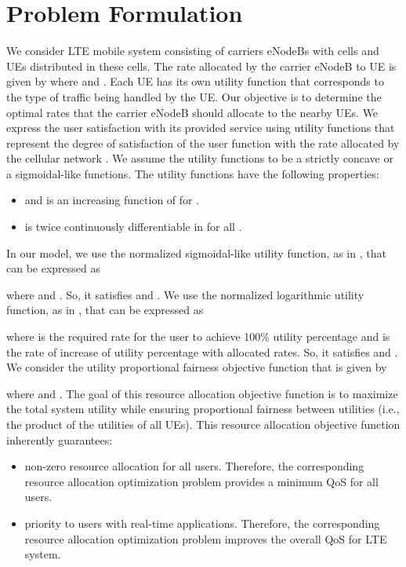 \documentclass[journal]{IEEEtran} 		\usepackage{amsmath,amssymb}
\begin{document}
\section{Problem Formulation}\label{sec:Problem_formulation}

We consider LTE mobile system consisting of  carriers eNodeBs with  cells and  UEs distributed in these cells. The rate allocated by the  carrier eNodeB to  UE is given by  where  and . Each UE has its own utility function  that corresponds to the type of traffic being handled by the  UE. Our objective is to determine the optimal rates that the  carrier eNodeB should allocate to the nearby UEs. We express the user satisfaction with its provided service using utility functions that represent the degree of satisfaction of the user function with the rate allocated by the cellular network \cite{DL_PowerAllocation} \cite{fundamental_design} \cite{UtilityFairness}. We assume the utility functions  to be a strictly concave or a sigmoidal-like functions. The utility functions have the following properties:

\begin{itemize}
\item  and  is an increasing function of  for .
\item  is twice continuously differentiable in  for all .
\end{itemize}
In our model, we use the normalized sigmoidal-like utility function, as in \cite{DL_PowerAllocation}, that can be expressed as

where  and . So, it satisfies  and . We use the normalized logarithmic utility function, as in \cite{UtilityFairness}, that can be expressed as

where  is the required rate for the user to achieve 100\% utility percentage and  is the rate of increase of utility percentage with allocated rates. So, it satisfies  and . We consider the utility proportional fairness objective function that is given by

where  and . The goal of this resource allocation objective function is to maximize the total system utility while ensuring proportional fairness between utilities (i.e., the product of the utilities of all UEs). This resource allocation objective function inherently guarantees:\begin{itemize}
 \item non-zero resource allocation for all users. Therefore, the corresponding resource allocation optimization problem provides a minimum QoS for all users.
 \item  priority to users with real-time applications. Therefore, the corresponding resource allocation optimization problem improves the overall QoS for LTE system.
\end{itemize}
\end{document}
